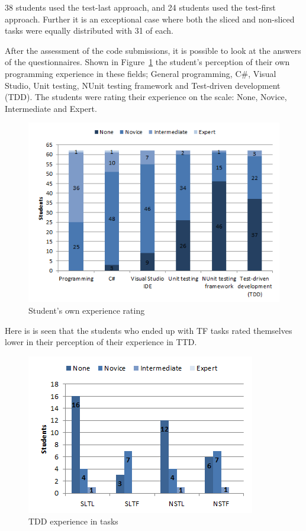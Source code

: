 \documentclass{sig-alternate-05-2015}
\begin{document}
38 students used the test-last approach, and 24 students used the test-first approach. Further it is an exceptional case where both the sliced and non-sliced tasks were equally distributed with 31 of each.

After the assessment of the code submissions, it is possible to look at the answers of the questionnaires. Shown in Figure~\ref{fig:Student's own experience rating} the student's perception of their own programming experience in these fields; General programming, C{\#}, Visual Studio, Unit testing, NUnit testing framework and Test-driven development (TDD).
The students were rating their experience on the scale: None, Novice, Intermediate and Expert.

\begin{figure}[!ht]
	\centering
	\includegraphics[width=1\linewidth]{img03}
	\caption{Student's own experience rating}
	\label{fig:Student's own experience rating}
\end{figure}

Here is is seen that the students who ended up with TF tasks rated themselves lower in their perception of their experience in TTD.

\begin{figure}[!ht]
	\centering
	\includegraphics[width=1\linewidth]{img04}
	\caption{TDD experience in tasks}
	\label{fig:TDD experience in tasks}
\end{figure}
\end{document}
